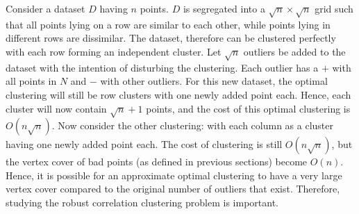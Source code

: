 Consider a dataset $D$ having $n$ points. $D$ is segregated into a $\sqrt{n} \times \sqrt{n}$ grid such that all points lying on a row are similar to each other, while points lying in different rows are dissimilar. The dataset, therefore can be clustered perfectly with each row forming an independent cluster. Let $\sqrt{n}$ outliers be added to the dataset with the intention of disturbing the clustering. Each outlier has a $+$ with all points in $N$ and $-$ with other outliers. For this new dataset, the optimal clustering will still be row clusters with one newly added point each. Hence, each cluster will now contain $\sqrt{n}+1$ points, and the cost of this optimal clustering is $O(n\sqrt{n})$. Now consider the other clustering: with each column as a cluster having one newly added point each. The cost of clustering is still $O(n\sqrt{n})$, but the vertex cover of bad points (as defined in previous sections) become $O(n)$. Hence, it is possible for an approximate optimal clustering to have a very large vertex cover compared to the original number of outliers that exist. Therefore, studying the robust correlation clustering problem is important.
